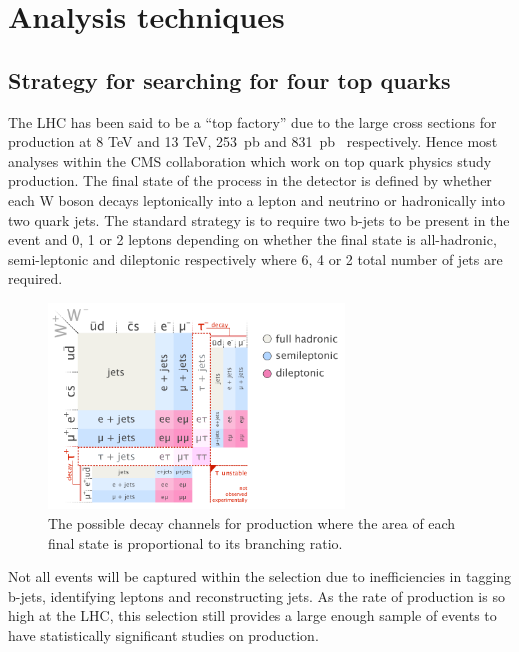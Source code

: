 \chapter{Analysis techniques \label{c:ana}}
\section{Strategy for searching for four top quarks \label{sec:Strategy}}

The LHC has been said to be a ``top factory'' due to the large cross sections for \ttbar production at 8 TeV and 13 TeV, 253~pb and 831~pb~\cite{PhysRevLett.110.252004,Czakon20142930} respectively. Hence most analyses within the CMS collaboration which work on top quark physics study \ttbar production. 
The final state of the \ttbar process in the detector is defined by whether each W boson decays leptonically into a lepton and neutrino or hadronically into two quark jets. The standard strategy is to require two b-jets to be present in the event and 0, 1 or 2 leptons depending on whether the final state is all-hadronic, semi-leptonic and dileptonic respectively where 6, 4 or 2 total number of jets are required. 

\begin{figure}[ht!]
\centering
    \includegraphics[width=0.7\textwidth]{images/Analysis/Ttbar_decay_channels.png}
    \caption{The possible decay channels for \ttbar production where the area of each final state is proportional to its branching ratio.}
    \label{fig:ttbarDecay}
\end{figure}

Not all \ttbar events will be captured within the selection due to inefficiencies in tagging b-jets, identifying leptons and reconstructing jets. As the rate of \ttbar production is so high at the LHC, this selection still provides a large enough sample of events to have statistically significant studies on \ttbar production.\\

